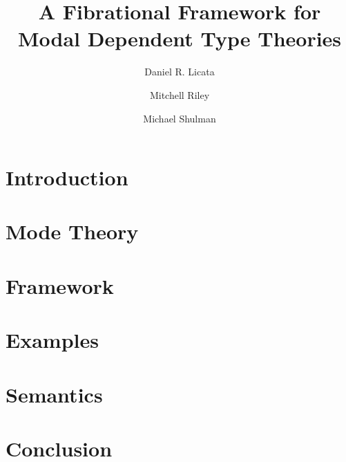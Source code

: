 \documentclass[UKenglish,letterpaper,cleveref,autoref]{lipics-v2019}
\title{A Fibrational Framework for Modal Dependent Type Theories}
\author{Daniel R. Licata}{Wesleyan University}{dlicata@wesleyan.edu}{https://orcid.org/0000-0003-0697-7405}{}
\author{Mitchell Riley}{Wesleyan University}{mvriley@wesleyan.edu}{?}
       {}%
\author{Michael Shulman}{University of San Diego}{shulman@sandiego.edu}{?}
       {}%
\theoremstyle{definition}
\begin{document}
\maketitle

\begin{abstract}

\end{abstract}

\section{Introduction}


\section{Mode Theory}


\section{Framework}\label{sec:dua-ret}


\section{Examples}


\section{Semantics}


\section{Conclusion}




{
  
}
\end{document}
